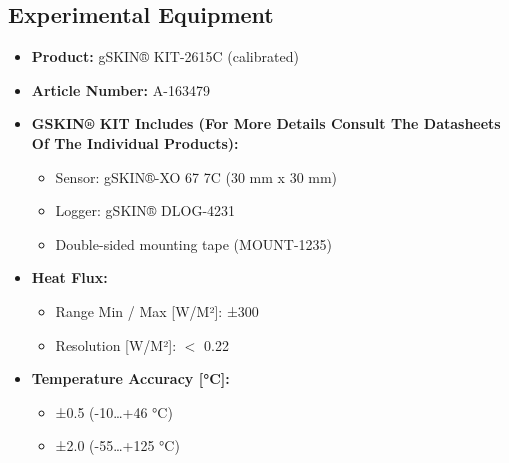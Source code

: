 

\begin{theappendices}


\chapter{Experimental Equipment}



\begin{table}[tbh]
\begin{framed}  
\small
{}
\begin{itemize}[topsep=1pt,itemsep=1pt,partopsep=1pt, parsep=1pt]
    \item \textbf{Product:} gSKIN® KIT-2615C (calibrated)
    \item \textbf{Article Number:} A-163479
    \item \textbf{GSKIN® KIT Includes (For More Details Consult The Datasheets Of The Individual Products):}
    \begin{itemize}[topsep=0pt,itemsep=0pt,partopsep=0pt, parsep=0pt]
        \item Sensor: gSKIN®-XO 67 7C (30 mm x 30 mm)
        \item Logger: gSKIN® DLOG-4231
        \item Double-sided mounting tape (MOUNT-1235)
    \end{itemize}
    \item \textbf{Heat Flux:}
    \begin{itemize}[topsep=0pt,itemsep=0pt,partopsep=0pt, parsep=0pt]
        \item Range Min / Max [W/M²]: ±300
        \item Resolution [W/M²]: $<$ 0.22
    \end{itemize}
    \item \textbf{Temperature Accuracy [°C]:}
    \begin{itemize}[topsep=0pt,itemsep=0pt,partopsep=0pt, parsep=0pt]
        \item ±0.5 (-10…+46 °C)
        \item ±2.0 (-55…+125 °C)
    \end{itemize}
    

\end{itemize}
\end{framed}
\end{table}
\end{theappendices}
